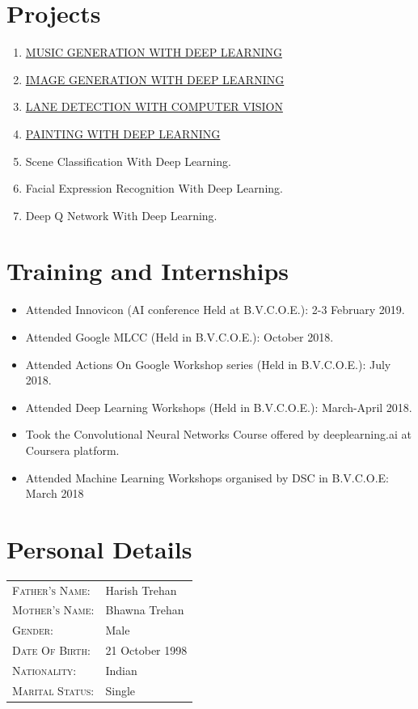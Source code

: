 \documentclass{my_cv}
\begin{document}
	\section{Projects}
	  \begin{enumerate}
	  	\item  \href{https://github.com/anuj2110/lstm-music-gen}{MUSIC GENERATION WITH DEEP LEARNING}
	  	\item \href{https://github.com/anuj2110/keras
	  	}{IMAGE GENERATION WITH DEEP LEARNING}
	  	\item \href{https://github.com/anuj2110/LaneDetection}{LANE DETECTION WITH COMPUTER VISION}
	  	\item \href{https://github.com/anuj2110/neural-style-transfer}{PAINTING WITH DEEP LEARNING}
	  	\item Scene Classification With Deep Learning.
	  	\item Facial Expression Recognition With Deep Learning.
	  	\item Deep Q Network With Deep Learning.
	  \end{enumerate}
	\section{Training and Internships}
		\begin{itemize}
			\item Attended Innovicon (AI conference Held at B.V.C.O.E.): 2-3 February 2019.
			\item Attended Google MLCC (Held in B.V.C.O.E.): October 2018.
			\item Attended Actions On Google Workshop series (Held in B.V.C.O.E.): July 2018.
			\item Attended Deep Learning Workshops (Held in B.V.C.O.E.): March-April 2018.
			\item Took the Convolutional Neural Networks Course offered by deeplearning.ai at Coursera platform.
			\item Attended Machine Learning Workshops organised by DSC in B.V.C.O.E: March 2018
			 
		\end{itemize}
	
    \section{Personal Details}
 
 	\begin{tabular}{ll}
    	\textsc{Father's Name:} & Harish Trehan \\
    	\textsc{Mother's Name:}       & Bhawna Trehan \\
    	\textsc{Gender:}         & Male \\
    	\textsc{Date Of Birth:}         & 21 October 1998 \\
    	\textsc{Nationality:}   & Indian \\
    	\textsc{Marital Status:} & Single \\
    \end{tabular}
	
\end{document}
